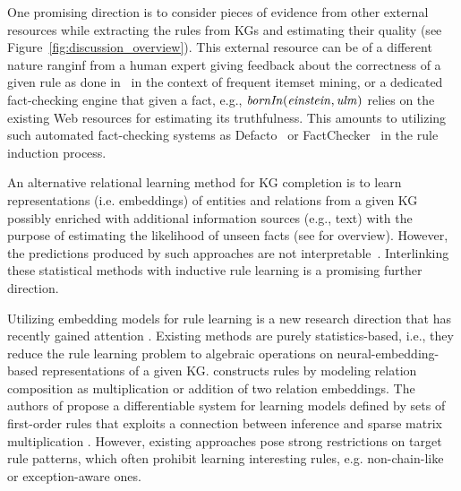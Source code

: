 One promising direction is to consider pieces of evidence from other external resources while extracting the rules from KGs and estimating their quality 
(see Figure~\ref{fig:discussion_overview}). This external resource can be of a different nature ranginf from %
a human expert giving feedback about the correctness of a given rule as done in~\cite{Dzyuba2017} in the context of frequent itemset mining, or a dedicated fact-checking engine that given a fact, e.g., $\mathit{bornIn(einstein,ulm)}$ relies on the existing Web resources for estimating its truthfulness. This amounts to utilizing such automated fact-checking systems as Defacto~\cite{defacto} or FactChecker~\cite{factchecker} in the rule induction process. 

An alternative relational learning method for KG completion is to learn representations (i.e. embeddings) of entities and relations from a given KG possibly enriched with additional information sources (e.g., text) with the %
purpose of estimating the likelihood of unseen facts (see \cite{Wang2017} for overview). However, the
predictions produced by such approaches are not interpretable~\cite{Shakerin2018}. Interlinking these statistical methods with inductive rule learning is a promising further direction.

 Utilizing embedding models for rule learning is a new research direction that has recently gained attention \cite{DBLP:conf/nips/YangYC17,DBLP:journals/corr/YangYHGD14a}. Existing methods are purely statistics-based, i.e., they reduce the rule learning problem to algebraic operations on neural-embedding-based representations of a given KG.  \cite{DBLP:journals/corr/YangYHGD14a} constructs rules by modeling relation composition as multiplication or addition of two relation embeddings. The authors of \cite{DBLP:conf/nips/YangYC17} propose a differentiable system for learning models defined by sets of first-order rules that exploits a connection between inference and sparse matrix multiplication \cite{DBLP:journals/corr/Cohen16b}. However, existing approaches pose strong restrictions on target rule patterns, which often prohibit learning interesting rules, e.g. non-chain-like or exception-aware ones.

